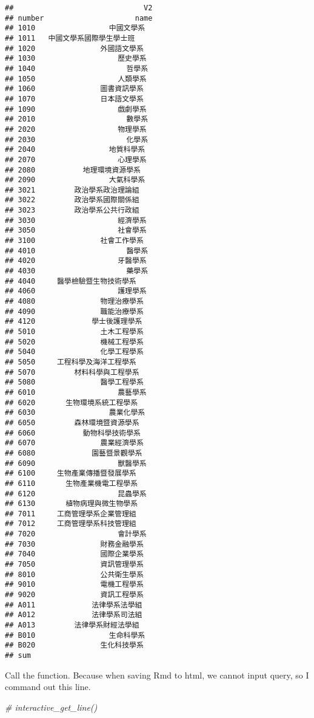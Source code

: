 \documentclass[
]{article}
\newenvironment{Shaded}{\begin{snugshade}}{\end{snugshade}}
\newcommand{\CommentTok}[1]{\textcolor[rgb]{0.56,0.35,0.01}{\textit{#1}}}
\begin{document}
\begin{verbatim}
##                              V2
## number                     name
## 1010                 中國文學系
## 1011   中國文學系國際學生學士班
## 1020               外國語文學系
## 1030                   歷史學系
## 1040                     哲學系
## 1050                   人類學系
## 1060               圖書資訊學系
## 1070               日本語文學系
## 1090                   戲劇學系
## 2010                     數學系
## 2020                   物理學系
## 2030                     化學系
## 2040                 地質科學系
## 2070                   心理學系
## 2080           地理環境資源學系
## 2090                 大氣科學系
## 3021         政治學系政治理論組
## 3022         政治學系國際關係組
## 3023         政治學系公共行政組
## 3030                   經濟學系
## 3050                   社會學系
## 3100               社會工作學系
## 4010                     醫學系
## 4020                   牙醫學系
## 4030                     藥學系
## 4040     醫學檢驗暨生物技術學系
## 4060                   護理學系
## 4080               物理治療學系
## 4090               職能治療學系
## 4120             學士後護理學系
## 5010               土木工程學系
## 5020               機械工程學系
## 5040               化學工程學系
## 5050     工程科學及海洋工程學系
## 5070         材料科學與工程學系
## 5080               醫學工程學系
## 6010                   農藝學系
## 6020       生物環境系統工程學系
## 6030                 農業化學系
## 6050         森林環境暨資源學系
## 6060           動物科學技術學系
## 6070               農業經濟學系
## 6080             園藝暨景觀學系
## 6090                   獸醫學系
## 6100     生物產業傳播暨發展學系
## 6110       生物產業機電工程學系
## 6120                   昆蟲學系
## 6130       植物病理與微生物學系
## 7011     工商管理學系企業管理組
## 7012     工商管理學系科技管理組
## 7020                   會計學系
## 7030               財務金融學系
## 7040               國際企業學系
## 7050               資訊管理學系
## 8010               公共衛生學系
## 9010               電機工程學系
## 9020               資訊工程學系
## A011             法律學系法學組
## A012             法律學系司法組
## A013         法律學系財經法學組
## B010                 生命科學系
## B020               生化科技學系
## sum
\end{verbatim}

Call the function. Because when saving Rmd to html, we cannot input
query, so I command out this line.

\begin{Shaded}
\begin{Highlighting}[]
\CommentTok{\# interactive\_get\_line()}
\end{Highlighting}
\end{Shaded}
\end{document}
